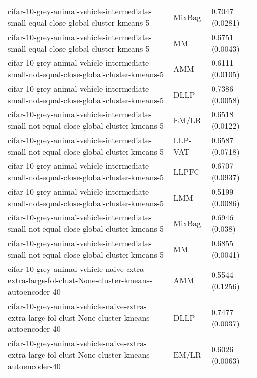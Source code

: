 \begin{longtable}{lll}
                          cifar-10-grey-animal-vehicle-intermediate-small-equal-close-global-cluster-kmeans-5 &    MixBag &                       0.7047 (0.0281) \\
                          cifar-10-grey-animal-vehicle-intermediate-small-equal-close-global-cluster-kmeans-5 &        MM &                       0.6751 (0.0043) \\
                      cifar-10-grey-animal-vehicle-intermediate-small-not-equal-close-global-cluster-kmeans-5 &       AMM &                       0.6111 (0.0105) \\
                      cifar-10-grey-animal-vehicle-intermediate-small-not-equal-close-global-cluster-kmeans-5 &      DLLP &                       0.7386 (0.0058) \\
                      cifar-10-grey-animal-vehicle-intermediate-small-not-equal-close-global-cluster-kmeans-5 &     EM/LR &                       0.6518 (0.0122) \\
                      cifar-10-grey-animal-vehicle-intermediate-small-not-equal-close-global-cluster-kmeans-5 &   LLP-VAT &                       0.6587 (0.0718) \\
                      cifar-10-grey-animal-vehicle-intermediate-small-not-equal-close-global-cluster-kmeans-5 &     LLPFC &                       0.6707 (0.0937) \\
                      cifar-10-grey-animal-vehicle-intermediate-small-not-equal-close-global-cluster-kmeans-5 &       LMM &                       0.5199 (0.0086) \\
                      cifar-10-grey-animal-vehicle-intermediate-small-not-equal-close-global-cluster-kmeans-5 &    MixBag &                        0.6946 (0.038) \\
                      cifar-10-grey-animal-vehicle-intermediate-small-not-equal-close-global-cluster-kmeans-5 &        MM &                       0.6855 (0.0041) \\
            cifar-10-grey-animal-vehicle-naive-extra-extra-large-fol-clust-None-cluster-kmeans-autoencoder-40 &       AMM &                       0.5544 (0.1256) \\
            cifar-10-grey-animal-vehicle-naive-extra-extra-large-fol-clust-None-cluster-kmeans-autoencoder-40 &      DLLP &                       0.7477 (0.0037) \\
            cifar-10-grey-animal-vehicle-naive-extra-extra-large-fol-clust-None-cluster-kmeans-autoencoder-40 &     EM/LR &                       0.6026 (0.0063) \\

\end{longtable}
